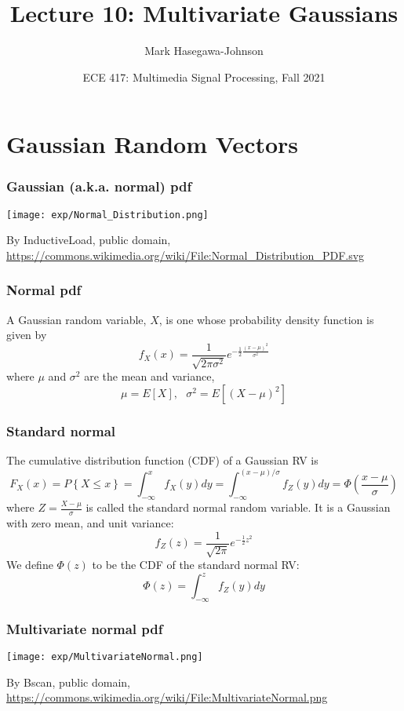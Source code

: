 \documentclass{beamer}
\title{Lecture 10: Multivariate Gaussians}
\author{Mark Hasegawa-Johnson}
\date{ECE 417: Multimedia Signal Processing, Fall 2021}
\begin{document}
\begin{frame}
  \maketitle
\end{frame}

\begin{frame}
  \tableofcontents
\end{frame}

\section[Gaussians]{Gaussian Random Vectors}
\setcounter{subsection}{1}

\begin{frame}
  \frametitle{Gaussian (a.k.a. normal) pdf}
  \centerline{\texttt{[image: exp/Normal\_Distribution.png]}}
  \begin{tiny}
    By InductiveLoad, public domain,
    \url{https://commons.wikimedia.org/wiki/File:Normal_Distribution_PDF.svg}
  \end{tiny}
\end{frame}

\begin{frame}
  \frametitle{Normal pdf}

  A Gaussian random variable, $X$, is one whose probability density
  function is given by
  \[
  f_X(x) = \frac{1}{\sqrt{2\pi\sigma^2}}e^{-\frac{1}{2}\frac{(x-\mu)^2}{\sigma^2}}
  \]
  where $\mu$ and $\sigma^2$ are the mean and variance,
  \[
  \mu=E\left[X\right],~~~
  \sigma^2 = E\left[(X-\mu)^2\right]
  \]
\end{frame}

\begin{frame}
  \frametitle{Standard normal}

  The cumulative distribution function (CDF) of a Gaussian RV is
  \[
  F_X(x)=P\left\{X\le x\right\}
  = \int_{-\infty}^x f_X(y)dy
  = \int_{-\infty}^{(x-\mu)/\sigma} f_Z(y)dy
  = \Phi\left(\frac{x-\mu}{\sigma}\right)
  \]
  where $Z=\frac{X-\mu}{\sigma}$ is called the standard normal random
  variable.  It  is a Gaussian with zero mean, and unit variance:
  \[
  f_Z(z) = \frac{1}{\sqrt{2\pi}}e^{-\frac{1}{2}z^2}
  \]
  We define $\Phi(z)$  to be the CDF of the standard normal RV:
  \[
  \Phi(z) =  \int_{-\infty}^{z} f_Z(y)dy
  \]
\end{frame}

\begin{frame}
  \frametitle{Multivariate normal pdf}
  \centerline{\texttt{[image: exp/MultivariateNormal.png]}}
  \begin{tiny}
    By Bscan, public domain,
    \url{https://commons.wikimedia.org/wiki/File:MultivariateNormal.png}
  \end{tiny}
\end{frame}
\end{document}
